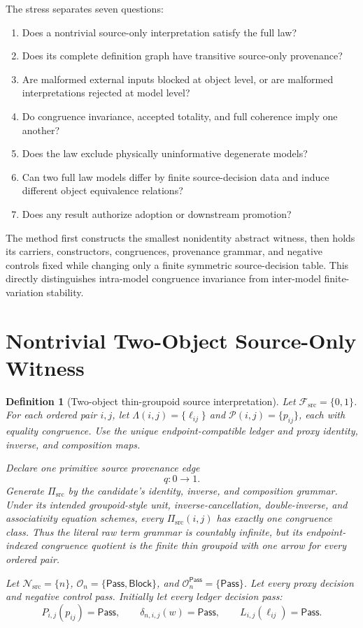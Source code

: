 \documentclass[11pt]{article}
\newtheorem{definition}{Definition}
\newcommand{\Pass}{\mathsf{Pass}}
\newcommand{\Block}{\mathsf{Block}}
\newcommand{\PiSrc}{\Pi_{\mathrm{src}}}
\begin{document}
The stress separates seven questions:
\begin{enumerate}[leftmargin=*]
  \item Does a nontrivial source-only interpretation satisfy the full law?
  \item Does its complete definition graph have transitive source-only
  provenance?
  \item Are malformed external inputs blocked at object level, or are
  malformed interpretations rejected at model level?
  \item Do congruence invariance, accepted totality, and full coherence imply
  one another?
  \item Does the law exclude physically uninformative degenerate models?
  \item Can two full law models differ by finite source-decision data and
  induce different object equivalence relations?
  \item Does any result authorize adoption or downstream promotion?
\end{enumerate}

The method first constructs the smallest nonidentity abstract witness, then
holds its carriers, constructors, congruences, provenance grammar, and negative
controls fixed while changing only a finite symmetric source-decision table.
This directly distinguishes intra-model congruence invariance from
inter-model finite-variation stability.

\section{Nontrivial Two-Object Source-Only Witness}

\begin{definition}[Two-object thin-groupoid source interpretation]
Let \(\mathcal F_{\mathrm{src}}=\{0,1\}\). For each ordered pair \(i,j\), let
\(\Lambda(i,j)=\{\ell_{ij}\}\) and
\(\mathcal P(i,j)=\{p_{ij}\}\), each with equality congruence. Use the unique
endpoint-compatible ledger and proxy identity, inverse, and composition maps.

Declare one primitive source provenance edge
\[
 q:0\longrightarrow 1.
\]
Generate \(\PiSrc\) by the candidate's identity, inverse, and composition
grammar. Under its intended groupoid-style unit, inverse-cancellation,
double-inverse, and associativity equation schemes, every
\(\PiSrc(i,j)\) has exactly one congruence class. Thus the literal raw term
grammar is countably infinite, but its endpoint-indexed congruence quotient is
the finite thin groupoid with one arrow for every ordered pair.

Let \(\mathcal N_{\mathrm{src}}=\{n\}\),
\(\mathcal O_n=\{\Pass,\Block\}\), and
\(\mathcal O_n^{\Pass}=\{\Pass\}\). Let every proxy decision and negative
control pass. Initially let every ledger decision pass:
\[
 P_{i,j}(p_{ij})=\Pass,\qquad
 \delta_{n,i,j}(w)=\Pass,\qquad
 L_{i,j}(\ell_{ij})=\Pass.
\]
\end{definition}
\end{document}
